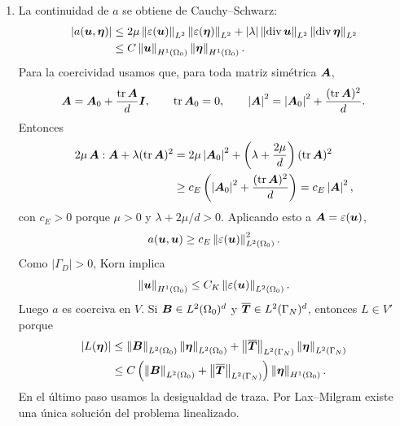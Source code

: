\documentclass[11pt]{article}
\newcommand{\norm}[1]{\left\lVert #1\right\rVert}
\newcommand{\abs}[1]{\left|#1\right|}
\def\vec   #1{\mbox{\boldmath $#1$}{}}
\def\ten   #1{\mbox{\boldmath $#1$}{}}
\DeclareMathOperator{\dive}{div}
\DeclareMathOperator{\tr}{tr}
\begin{document}
\begin{enumerate}[label=\textbf{\arabic*.}, leftmargin=*]
\begin{enumerate}[label=(\alph*)]
        \item La continuidad de $a$ se obtiene de Cauchy--Schwarz:
        \[
        \begin{aligned}
            \abs{a(\vec u,\vec\eta)}
            &\le
            2\mu\norm{\varepsilon(\vec u)}_{L^2}
            \norm{\varepsilon(\vec\eta)}_{L^2}
            +|\lambda|
            \norm{\dive\vec u}_{L^2}
            \norm{\dive\vec\eta}_{L^2}\\
            &\le
            C\norm{\vec u}_{H^1(\Omega_0)}
            \norm{\vec\eta}_{H^1(\Omega_0)}.
        \end{aligned}
        \]
        Para la coercividad usamos que, para toda matriz simétrica $\ten A$,
        \[
            \ten A=\ten A_0+\frac{\tr\ten A}{d}\ten I,
            \qquad
            \tr\ten A_0=0,
            \qquad
            \abs{\ten A}^2=\abs{\ten A_0}^2+\frac{(\tr\ten A)^2}{d}.
        \]
        Entonces
        \[
        \begin{aligned}
            2\mu\,\ten A:\ten A+\lambda(\tr\ten A)^2
            &=
            2\mu\abs{\ten A_0}^2
            +\left(\lambda+\frac{2\mu}{d}\right)(\tr\ten A)^2\\
            &\ge
            c_E\left(
            \abs{\ten A_0}^2+\frac{(\tr\ten A)^2}{d}
            \right)
            =
            c_E\abs{\ten A}^2,
        \end{aligned}
        \]
        con $c_E>0$ porque $\mu>0$ y $\lambda+2\mu/d>0$. Aplicando esto a $\ten A=\varepsilon(\vec u)$,
        \[
            a(\vec u,\vec u)\ge c_E\norm{\varepsilon(\vec u)}_{L^2(\Omega_0)}^2.
        \]
        Como $|\Gamma_D|>0$, Korn implica
        \[
            \norm{\vec u}_{H^1(\Omega_0)}
            \le C_K\norm{\varepsilon(\vec u)}_{L^2(\Omega_0)}.
        \]
        Luego $a$ es coerciva en $V$. Si $\vec B\in L^2(\Omega_0)^d$ y $\overline{\vec T}\in L^2(\Gamma_N)^d$, entonces $L\in V'$ porque
        \[
        \begin{aligned}
            \abs{L(\vec\eta)}
            &\le
            \norm{\vec B}_{L^2(\Omega_0)}
            \norm{\vec\eta}_{L^2(\Omega_0)}
            +\norm{\overline{\vec T}}_{L^2(\Gamma_N)}
            \norm{\vec\eta}_{L^2(\Gamma_N)}\\
            &\le
            C\left(
            \norm{\vec B}_{L^2(\Omega_0)}
            +\norm{\overline{\vec T}}_{L^2(\Gamma_N)}
            \right)\norm{\vec\eta}_{H^1(\Omega_0)}.
        \end{aligned}
        \]
        En el último paso usamos la desigualdad de traza. Por Lax--Milgram existe una única solución del problema linealizado.
    \end{enumerate}

\end{enumerate}
\end{document}
